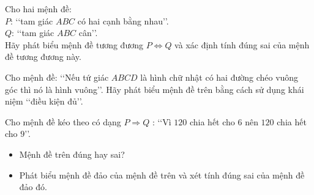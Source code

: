 \begin{bt}[Mức độ 1]%
	Cho hai mệnh đề:\\
	$P$: \lq \lq tam giác $ABC$ có hai cạnh bằng nhau\rq \rq. \\
	$Q$: \lq \lq tam giác $ABC$ cân\rq \rq. \\
	Hãy phát biểu mệnh đề tương đương $P \Leftrightarrow Q$ và xác định tính đúng sai của mệnh đề tương đương này.
\end{bt}

\begin{bt}%
	Cho mệnh đề: \lq\lq Nếu tứ giác $ABCD$ là hình chữ nhật có hai đường chéo vuông góc thì nó là hình vuông\rq\rq . Hãy phát biểu mệnh đề trên bằng cách sử dụng khái niệm \lq\lq điều kiện đủ\rq\rq .
\end{bt}

\begin{bt}%
	Cho mệnh đề kéo theo có dạng $P \Rightarrow Q$ : \lq\lq Vì $120$ chia hết cho $6$ nên $120$ chia hết cho $9$\rq\rq.
	\begin{itemize}
		\item[a)] Mệnh đề trên đúng hay sai?
		\item[b)] Phát biểu mệnh đề đảo của mệnh đề trên và xét tính đúng sai của mệnh đề đảo đó.
	\end{itemize}
\end{bt}


